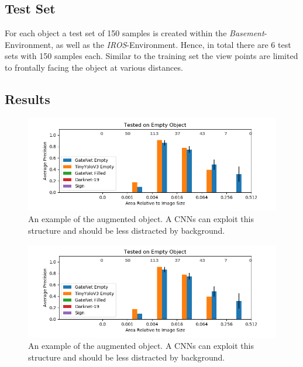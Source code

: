 \subsection{Test Set}

For each object a test set of 150 samples is created within the \textit{Basement}-Environment, as well as the \textit{IROS}-Environment. Hence, in total there are 6 test sets with 150 samples each. Similar to the training set the view points are limited to frontally facing the object at various distances.


\subsection{Results}

\begin{figure}
	\includegraphics[width=\textwidth]{fig/basement_gate_size}
	\caption{An example of the augmented object. A \acp{CNN} can exploit this structure and should be less distracted by background.}
	\label{fig:basement_gate}
\end{figure}

\begin{figure}
	\includegraphics[width=\textwidth]{fig/basement_gate_size}
	\caption{An example of the augmented object. A \acp{CNN} can exploit this structure and should be less distracted by background.}
	\label{fig:basement_sign}
\end{figure}

